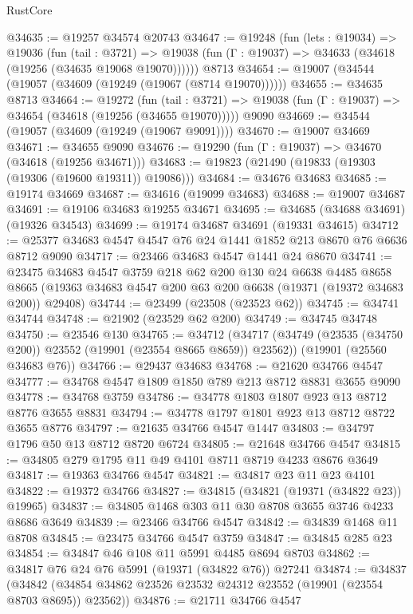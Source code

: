 \begin{lexlean}{RustCore}
\begin{coremodule}
@34635 := @19257 @34574 @20743
@34647 := @19248
    (fun (lets : @19034) =>
    @19036
      (fun (tail : @3721) =>
      @19038 (fun (Γ : @19037) => @34633 (@34618 (@19256 (@34635 @19068 @19070))))))
    @8713
@34654 := @19007 (@34544 (@19057 (@34609 (@19249 (@19067 (@8714 @19070))))))
@34655 := @34635 @8713
@34664 := @19272
    (fun (tail : @3721) => @19038 (fun (Γ : @19037) => @34654 (@34618 (@19256 (@34655 @19070)))))
    @9090
@34669 := @34544 (@19057 (@34609 (@19249 (@19067 @9091))))
@34670 := @19007 @34669
@34671 := @34655 @9090
@34676 := @19290 (fun (Γ : @19037) => @34670 (@34618 (@19256 @34671)))
@34683 := @19823 (@21490 (@19833 (@19303 (@19306 (@19600 @19311)) @19086)))
@34684 := @34676 @34683
@34685 := @19174 @34669
@34687 := @34616 (@19099 @34683)
@34688 := @19007 @34687
@34691 := @19106 @34683 @19255 @34671
@34695 := @34685 (@34688 @34691) (@19326 @34543)
@34699 := @19174 @34687 @34691 (@19331 @34615)
@34712 := @25377 @34683 @4547 @4547 @76 @24 @1441 @1852 @213 @8670 @76 @6636 @8712 @9090
@34717 := @23466 @34683 @4547 @1441 @24 @8670
@34741 := @23475
    @34683
    @4547
    @3759
    @218
    @62
    @200
    @130
    @24
    @6638
    @4485
    @8658
    @8665
    (@19363 @34683 @4547 @200 @63 @200 @6638 (@19371 (@19372 @34683 @200)) @29408)
@34744 := @23499 (@23508 (@23523 @62))
@34745 := @34741 @34744
@34748 := @21902 (@23529 @62 @200)
@34749 := @34745 @34748
@34750 := @23546 @130
@34765 := @34712
    (@34717 (@34749 (@23535 (@34750 @200)) @23552 (@19901 (@23554 @8665 @8659)) @23562))
    (@19901 (@25560 @34683 @76))
@34766 := @29437 @34683
@34768 := @21620 @34766 @4547
@34777 := @34768 @4547 @1809 @1850 @789 @213 @8712 @8831 @3655 @9090
@34778 := @34768 @3759
@34786 := @34778 @1803 @1807 @923 @13 @8712 @8776 @3655 @8831
@34794 := @34778 @1797 @1801 @923 @13 @8712 @8722 @3655 @8776
@34797 := @21635 @34766 @4547 @1447
@34803 := @34797 @1796 @50 @13 @8712 @8720 @6724
@34805 := @21648 @34766 @4547
@34815 := @34805 @279 @1795 @11 @49 @4101 @8711 @8719 @4233 @8676 @3649
@34817 := @19363 @34766 @4547
@34821 := @34817 @23 @11 @23 @4101
@34822 := @19372 @34766
@34827 := @34815 (@34821 (@19371 (@34822 @23)) @19965)
@34837 := @34805 @1468 @303 @11 @30 @8708 @3655 @3746 @4233 @8686 @3649
@34839 := @23466 @34766 @4547
@34842 := @34839 @1468 @11 @8708
@34845 := @23475 @34766 @4547 @3759
@34847 := @34845 @285 @23
@34854 := @34847 @46 @108 @11 @5991 @4485 @8694 @8703
@34862 := @34817 @76 @24 @76 @5991 (@19371 (@34822 @76)) @27241
@34874 := @34837
    (@34842 (@34854 @34862 @23526 @23532 @24312 @23552 (@19901 (@23554 @8703 @8695)) @23562))
@34876 := @21711 @34766 @4547

\end{coremodule}
\end{lexlean}
